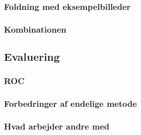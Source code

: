 \subsubsection{Foldning med eksempelbilleder} %
\subsubsection{Kombinationen} %
\subsection{Evaluering}
\subsubsection{ROC}
\subsubsection{Forbedringer af endelige metode}
\subsubsection{Hvad arbejder andre med} %
